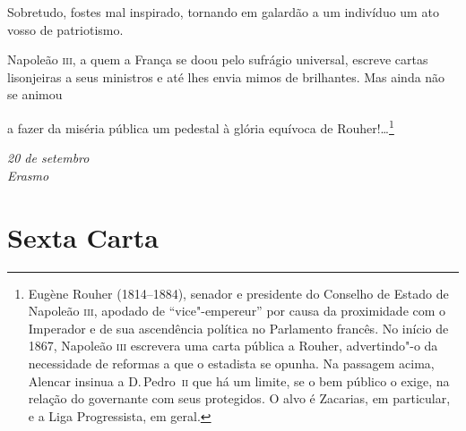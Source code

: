 \begin{linenumbers}
 Sobretudo, fostes mal inspirado, tornando em galardão a um indivíduo um
ato vosso de patriotismo.

 Napoleão \textsc{iii}, a quem a França se doou pelo sufrágio universal, escreve
cartas lisonjeiras a seus ministros e até lhes envia mimos de
brilhantes. Mas ainda não se animou \linebreak

\pagebreak

\noindent{}a fazer da miséria pública um
pedestal à glória equívoca de
Rouher!\ldots{}\footnote{ Eugène Rouher (1814--1884), senador e presidente do Conselho de Estado
de Napoleão \textsc{iii}, apodado de ``vice"-empereur'' por causa da proximidade 
com o Imperador e de sua ascendência política no Parlamento francês. No
início de 1867, Napoleão \textsc{iii} escrevera uma carta pública a Rouher,
advertindo"-o da necessidade de reformas a que o estadista se opunha.
Na passagem acima, Alencar insinua a D.\,Pedro~\textsc{ii} que há um limite, se o
bem público o exige, na relação do governante com seus protegidos. O
alvo é Zacarias, em particular, e a Liga Progressista, em geral.}

\end{linenumbers}

\begin{flushright}
\textit{20 de setembro\\ 
Erasmo}
\end{flushright} 

\chapter[Sexta Carta]{Sexta Carta }

